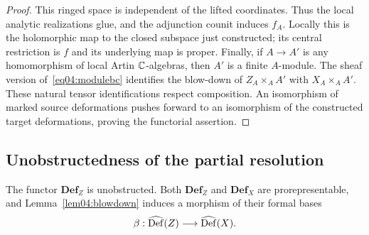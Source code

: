 \begin{proof}
This ringed space is independent of the lifted coordinates.  Thus the
local analytic realizations glue, and the adjunction counit induces
$f_A$.  Locally this is the holomorphic map to the closed subspace just
constructed; its central restriction is $f$ and its underlying map is
proper.  Finally, if $A\to A'$ is any homomorphism of local Artin
$\mathbb{C}$-algebras, then $A'$ is a finite $A$-module.  The sheaf version
of~\eqref{eq04:modulebc} identifies the blow-down of
$Z_A\times_A A'$ with $X_A\times_A A'$.  These natural tensor
identifications respect composition.  An isomorphism of marked source
deformations pushes forward to an isomorphism of the constructed target
deformations, proving the functorial assertion.
\end{proof}

\subsection{Unobstructedness of the partial resolution}

\begin{lemma}\label{lem04:unobstructed}
The functor $\mathbf{Def}_Z$ is unobstructed.  Both
$\mathbf{Def}_Z$ and $\mathbf{Def}_X$ are prorepresentable, and
Lemma~\ref{lem04:blowdown} induces a morphism of their formal bases
\begin{equation}\label{eq04:beta}
 \beta:\widehat{\operatorname{Def}}(Z)\longrightarrow\widehat{\operatorname{Def}}(X).
\end{equation}
\end{lemma}

